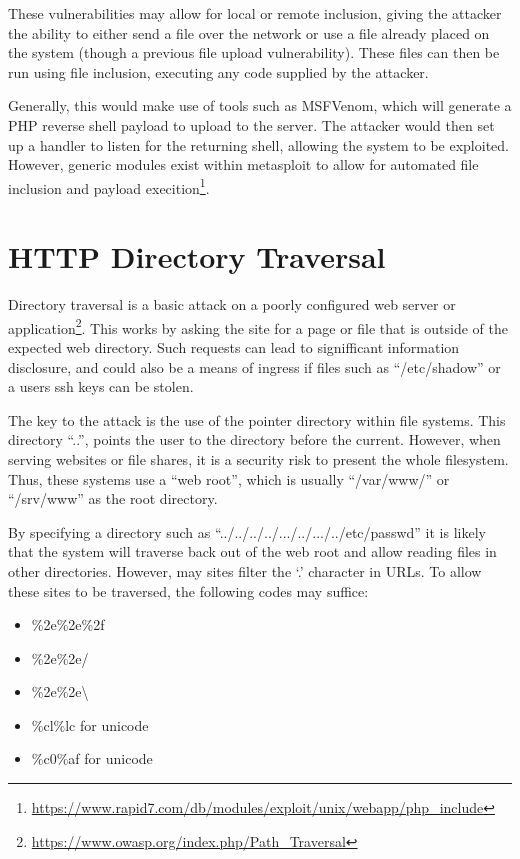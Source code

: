 		These vulnerabilities may allow for local or remote inclusion, giving the attacker the ability to either send a file over the network or use a file already placed on the system (though a previous file upload vulnerability). 
		These files can then be run using file inclusion, executing any code supplied by the attacker. 

		Generally, this would make use of tools such as MSFVenom, which will generate a PHP reverse shell payload to upload to the server. 
		The attacker would then set up a handler to listen for the returning shell, allowing the system to be exploited. 
		However, generic modules exist within metasploit to allow for automated file inclusion and payload 
		execition\footnote{\url{https://www.rapid7.com/db/modules/exploit/unix/webapp/php\_include}}.
		

	\section{HTTP Directory Traversal}
		Directory traversal is a basic attack on a poorly configured web server or application\footnote{\url{https://www.owasp.org/index.php/Path\_Traversal}}. 
		This works by asking the site for a page or file that is outside of the expected web directory. 
		Such requests can lead to signifficant information disclosure, and could also be a means of ingress if files such as ``/etc/shadow'' or a users ssh keys can be stolen. 

		The key to the attack is the use of the pointer directory within file systems. 
		This directory ``..'', points the user to the directory before the current. 
		However, when serving websites or file shares, it is a security risk to present the whole filesystem. 
		Thus, these systems use a ``web root'', which is usually ``/var/www/'' or ``/srv/www'' as the root directory. 

		By specifying a directory such as ``../../../../.../../.../../etc/passwd'' it is likely that the system will traverse back out of the web root and allow reading files in other directories. 
		However, may sites filter the `.' character in URLs. 
		To allow these sites to be traversed, the following codes may suffice:
		\begin{itemize}
			\item \%2e\%2e\%2f
			\item \%2e\%2e/
			\item \%2e\%2e\textbackslash
			\item \%cl\%lc for unicode
			\item \%c0\%af for unicode
		\end{itemize}

